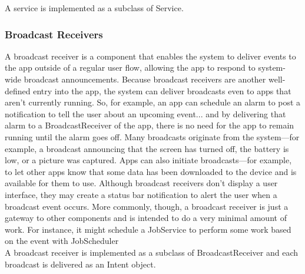 \documentclass[14pt]{report}
\begin{document}
					A service is implemented as a subclass of Service. 
				\subsubsection{Broadcast Receivers}
					A broadcast receiver is a component that enables the system to deliver events to the app outside of a regular user flow, allowing the app to respond to system-wide broadcast announcements. Because broadcast receivers are another well-defined entry into the app, the system can deliver broadcasts even to apps that aren't currently running. So, for example, an app can schedule an alarm to post a notification to tell the user about an upcoming event... and by delivering that alarm to a BroadcastReceiver of the app, there is no need for the app to remain running until the alarm goes off. Many broadcasts originate from the system—for example, a broadcast announcing that the screen has turned off, the battery is low, or a picture was captured. Apps can also initiate broadcasts—for example, to let other apps know that some data has been downloaded to the device and is available for them to use. Although broadcast receivers don't display a user interface, they may create a status bar notification to alert the user when a broadcast event occurs. More commonly, though, a broadcast receiver is just a gateway to other components and is intended to do a very minimal amount of work. For instance, it might schedule a JobService to perform some work based on the event with JobScheduler\\
					
					A broadcast receiver is implemented as a subclass of BroadcastReceiver and each broadcast is delivered as an Intent object.	
\end{document}

